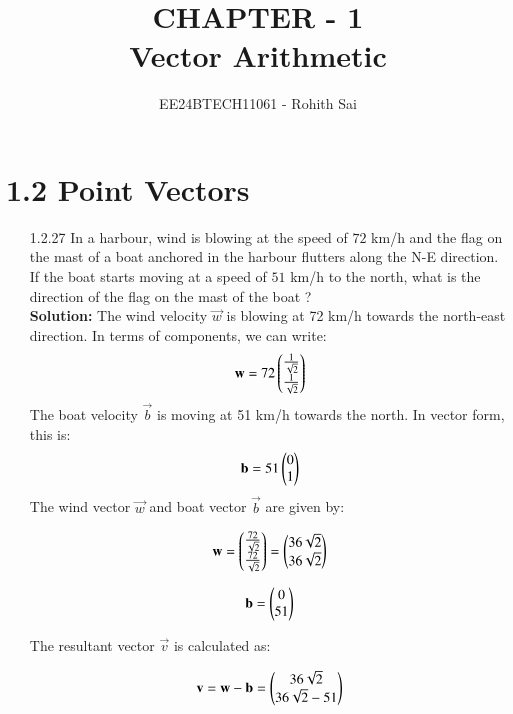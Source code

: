 \documentclass[journal]{IEEEtran}
\begin{document}

\vspace{3cm}

\title{CHAPTER - 1\\Vector Arithmetic}
\author{EE24BTECH11061 - Rohith Sai}
\maketitle

\renewcommand{\thefigure}{\theenumi}
\renewcommand{\thetable}{\theenumi}

\section{1.2 Point Vectors}
\begin{enumerate}
\item [1.2.27] In a harbour, wind is blowing at the speed of $72$ km/h and the flag on the mast of a boat anchored in the harbour flutters along the N-E direction. If the boat starts moving at a speed of $51$ km/h to the north, what is the direction of the flag on the
mast of the boat ?\\
\textbf{Solution:}
The wind velocity $\vec{w}$ is blowing at 72 km/h towards the north-east direction. In terms of components, we can write:
\begin{align}
    \mathbf{w} = 72 \begin{pmatrix}
    \frac{1}{\sqrt{2}} \\
    \frac{1}{\sqrt{2}}\end{pmatrix}
\end{align}
The boat velocity $\vec{b}$ is moving at 51 km/h towards the north. In vector form, this is:
\begin{align}
    \mathbf{b} = 51 \begin{pmatrix}
    0 \\
    1\end{pmatrix}
\end{align}
The wind vector $\vec{w}$ and boat vector $\vec{b}$ are given by:

\begin{align}
\mathbf{w} = \begin{pmatrix}
\frac{72}{\sqrt{2}} \\
\frac{72}{\sqrt{2}}\end{pmatrix}=\begin{pmatrix}36\sqrt{2}\\36\sqrt{2}\end{pmatrix}
\end{align}

\begin{align}
\mathbf{b} = \begin{pmatrix}
0 \\
51\end{pmatrix}
\end{align}

The resultant vector $\vec{v}$ is calculated as:

\begin{align}
\mathbf{v} = \mathbf{w} - \mathbf{b} = \begin{pmatrix}
36\sqrt{2} \\
36\sqrt{2} - 51
\end{pmatrix}
\end{align}


\end{enumerate}
\end{document}
